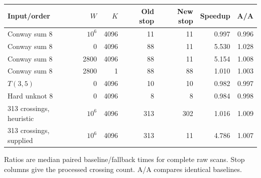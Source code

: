 \begin{center}\small
\begin{tabular}{@{}lrrrrrr@{}}
\toprule
Input/order & $W$ & $K$ & Old stop & New stop & Speedup & A/A \\
\midrule
Conway sum 8 & $10^6$ & 4096 & 11 & 11 & 0.997 & 0.996 \\
Conway sum 8 & 0 & 4096 & 88 & 11 & 5.530 & 1.028 \\
Conway sum 8 & 2800 & 4096 & 88 & 11 & 5.154 & 1.008 \\
Conway sum 8 & 2800 & 1 & 88 & 88 & 1.010 & 1.003 \\
$T(3,5)$ & 0 & 4096 & 10 & 10 & 0.982 & 0.997 \\
Hard unknot 8 & 0 & 4096 & 8 & 8 & 0.984 & 0.998 \\
313 crossings, heuristic & $10^6$ & 4096 & 313 & 302 & 1.016 & 1.009 \\
313 crossings, supplied & $10^6$ & 4096 & 313 & 11 & 4.786 & 1.007 \\
\bottomrule
\end{tabular}
\end{center}
Ratios are median paired baseline/fallback times for complete raw scans. Stop columns give the processed crossing count. A/A compares identical baselines.
